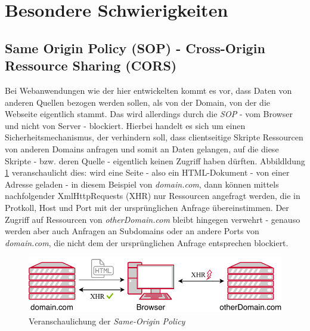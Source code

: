 \section{Besondere Schwierigkeiten}
\subsection{Same Origin Policy (SOP) - Cross-Origin Ressource Sharing (CORS)}
\label{sec:prog:special:cors}
Bei Webanwendungen wie der hier entwickelten kommt es vor, dass Daten von anderen Quellen bezogen werden sollen, als von der Domain, von der die Webseite eigentlich stammt. Das wird allerdings durch die \textit{\acf{SOP}} - vom Browser und nicht von Server - blockiert. Hierbei handelt es sich um einen Sicherheitsmechanismus, der verhindern soll, dass clientseitige Skripte Ressourcen von anderen Domains anfragen und somit an Daten gelangen, auf die diese  Skripte - bzw. deren Quelle - eigentlich keinen Zugriff haben dürften. Abbildldung \ref{fig:technologies:prog:sop} veranschaulicht dies: wird eine Seite - also ein \acs {HTML}-Dokument - von einer Adresse geladen - in diesem Beispiel von \textit{domain.com}, dann können mittels nachfolgender XmlHttpRequests (XHR) nur Ressourcen angefragt werden, die in Protkoll, Host und Port mit der ursprünglichen Anfrage übereinstimmen. Der Zugriff auf Ressourcen von \textit{otherDomain.com} bleibt hingegen verwehrt - genauso werden aber auch Anfragen an Subdomains oder an andere Ports von \textit{domain.com}, die nicht dem der ursprünglichen Anfrage entsprechen blockiert.
\begin{figure}[h]
\centering
	\includegraphics{gfx/SOP}
	\caption{Veranschaulichung der \textit{Same-Origin Policy}}
	\label{fig:technologies:prog:sop}
\end{figure}
